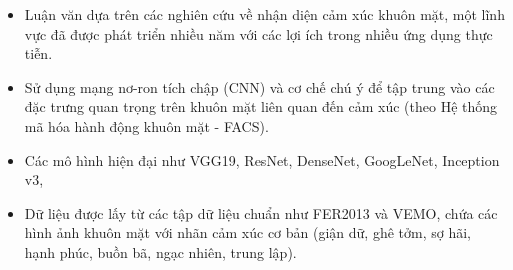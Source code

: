 \begin{itemize}
    \item Luận văn dựa trên các nghiên cứu về nhận diện cảm xúc khuôn mặt, một lĩnh vực đã được phát triển nhiều năm với các lợi ích trong nhiều ứng dụng thực tiễn.
    \item Sử dụng mạng nơ-ron tích chập (CNN) và cơ chế chú ý để tập trung vào các đặc trưng quan trọng trên khuôn mặt liên quan đến cảm xúc (theo Hệ thống mã hóa hành động khuôn mặt - FACS).
    \item Các mô hình hiện đại như VGG19, ResNet, DenseNet, GoogLeNet, Inception v3, 
    \item Dữ liệu được lấy từ các tập dữ liệu chuẩn như FER2013 và VEMO, chứa các hình ảnh khuôn mặt với nhãn cảm xúc cơ bản (giận dữ, ghê tởm, sợ hãi, hạnh phúc, buồn bã, ngạc nhiên, trung lập).
\end{itemize}